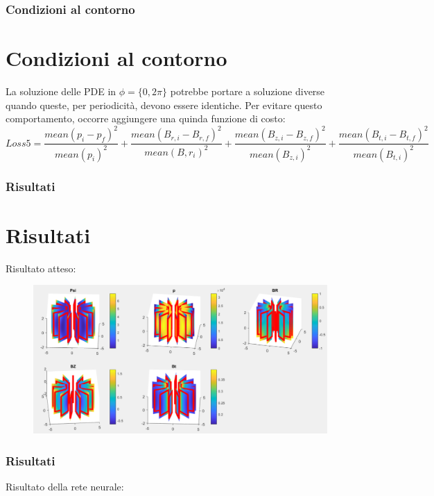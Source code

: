 \documentclass{beamer}
\begin{document}
\begin{frame}
	\frametitle{Condizioni al contorno}
	\section{Condizioni al contorno}
	La soluzione delle PDE in \(\phi = \{ 0,2\pi \} \) potrebbe portare a soluzione diverse quando queste, per periodicità, devono essere identiche. Per evitare questo comportamento, occorre aggiungere una quinda funzione di costo:\begin{equation*}
		Loss5 = \frac{mean{(p_{i}-p_{f})}^{2}}{mean{(p_{i})}^{2}}+\frac{mean{(B_{r,i}-B_{r,f})}^{2}}{mean{(B,r_{i})}^{2}}+\frac{mean{(B_{z,i}-B_{z,f})}^{2}}{mean{(B_{z,i})}^{2}}+\frac{mean{(B_{t,i}-B_{t,f})}^{2}}{mean{(B_{t,i})}^{2}}
	\end{equation*}
\end{frame}
\begin{frame}
	\frametitle{Risultati}
	\section{Risultati}
		Risultato atteso:
		\begin{figure}
			\includegraphics[scale=0.4]{2022-06-07-15-42-03.png}%
		\end{figure}
\end{frame}
\begin{frame}
	\frametitle{Risultati}
	Risultato della rete neurale:


\end{frame}
\end{document}
